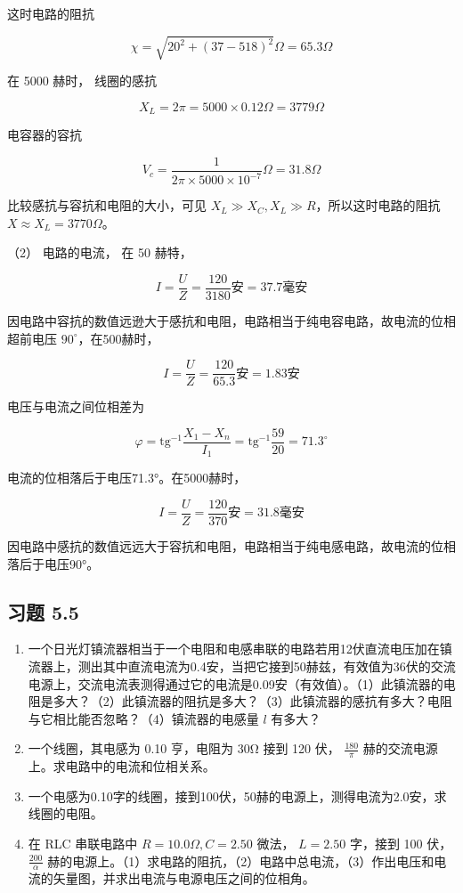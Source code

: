 这时电路的阻抗

\[
\chi = \sqrt{20^{2} + (37 - 518)^{2}} \Omega = 65.3 \Omega
\]

在 5000 赫时， 线圈的感抗

\[
X_{L} = 2 \pi = 5000 \times 0.12 \Omega = 3779 \Omega
\]

电容器的容抗

\[
V_{c} = \frac{1}{2 \pi \times 5000 \times 10^{- 7}} \Omega = 31.8 \Omega
\]

比较感抗与容抗和电阻的大小，可见
\(X_{L} \gg X_{C}, X_{L} \gg R\)，所以这时电路的阻抗
\(X \approx X_{L} = 3770 \Omega\)。

（2） 电路的电流， 在 50 赫特，

\[
I = \frac{U}{Z} = \frac{120}{3180} \text{安} = 37.7 \text{毫安}
\]

因电路中容抗的数值远逊大于感抗和电阻，电路相当于纯电容电路，故电流的位相超前电压
\(90^{\circ}\)，在500赫时，

\[
I = \frac{U}{Z} = \frac{120}{65.3} \text{安} = 1.83 \text{安}
\]

电压与电流之间位相差为

\[
\varphi = \mathrm{tg}^{- 1} \frac{X_{1} - X_{n}}{I_{1}} = \mathrm{tg}^{- 1} \frac{59}{20} = 71.3^{\circ}
\]

电流的位相落后于电压71.3°。在5000赫时，

\[
I = \frac{U}{Z} = \frac{120}{370} \text{安} = 31.8 \text{毫安}
\]

因电路中感抗的数值远远大于容抗和电阻，电路相当于纯电感电路，故电流的位相落后于电压90°。

\subsection{习题 5.5}\label{ux4e60ux9898-5.5}

\begin{enumerate}
\def\labelenumi{\arabic{enumi}.}
\item
  一个日光灯镇流器相当于一个电阻和电感串联的电路若用12伏直流电压加在镇流器上，测出其中直流电流为0.4安，当把它接到50赫兹，有效值为36伏的交流电源上，交流电流表测得通过它的电流是0.09安（有效值）。（1）此镇流器的电阻是多大？（2）此镇流器的阻抗是多大？（3）此镇流器的感抗有多大？电阻与它相比能否忽略？（4）镇流器的电感量
  \(l\) 有多大？
\item
  一个线圈，其电感为 0.10 亨，电阻为 30Ω 接到 120 伏，
  \(\frac{180}{\pi}\) 赫的交流电源上。求电路中的电流和位相关系。
\item
  一个电感为0.10字的线圈，接到100伏，50赫的电源上，测得电流为2.0安，求线圈的电阻。
\item
  在 RLC 串联电路中 \(R=10.0\Omega, C=2.50\) 微法， \(L=2.50\) 字，接到
  100 伏， \(\frac{200}{\alpha}\)
  赫的电源上。（1）求电路的阻抗，（2）电路中总电流，（3）作出电压和电流的矢量图，并求出电流与电源电压之间的位相角。
\end{enumerate}

